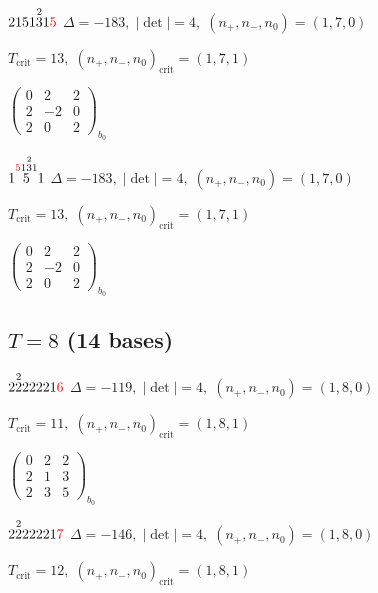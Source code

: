 \documentclass[10pt]{article}
\begin{document}
$2151\overset{2}{3}1\textcolor{red}{5}$ \quad $\Delta=-183,\; |\det|=4,\; (n_+,n_-,n_0)=(1,7,0)$

\hspace{1em}$T_{\text{crit}}=13,\; (n_+,n_-,n_0)_{\text{crit}}=(1,7,1)$

\hspace{2em}$\left(\begin{smallmatrix}0 & 2 & 2 \\ 2 & -2 & 0 \\ 2 & 0 & 2\end{smallmatrix}\right)_{\!b_0}$

\smallskip

$1\overset{\textcolor{red}{5}1\overset{2}{3}1}{5}1$ \quad $\Delta=-183,\; |\det|=4,\; (n_+,n_-,n_0)=(1,7,0)$

\hspace{1em}$T_{\text{crit}}=13,\; (n_+,n_-,n_0)_{\text{crit}}=(1,7,1)$

\hspace{2em}$\left(\begin{smallmatrix}0 & 2 & 2 \\ 2 & -2 & 0 \\ 2 & 0 & 2\end{smallmatrix}\right)_{\!b_0}$


\subsection*{$T = 8$ \quad (14 bases)}
\smallskip

$2\overset{2}{2}22221\textcolor{red}{6}$ \quad $\Delta=-119,\; |\det|=4,\; (n_+,n_-,n_0)=(1,8,0)$

\hspace{1em}$T_{\text{crit}}=11,\; (n_+,n_-,n_0)_{\text{crit}}=(1,8,1)$

\hspace{2em}$\left(\begin{smallmatrix}0 & 2 & 2 \\ 2 & 1 & 3 \\ 2 & 3 & 5\end{smallmatrix}\right)_{\!b_0}$

$2\overset{2}{2}22221\textcolor{red}{7}$ \quad $\Delta=-146,\; |\det|=4,\; (n_+,n_-,n_0)=(1,8,0)$

\hspace{1em}$T_{\text{crit}}=12,\; (n_+,n_-,n_0)_{\text{crit}}=(1,8,1)$
\end{document}
